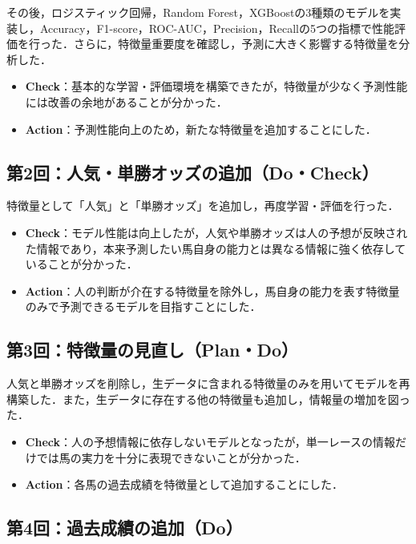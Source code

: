 \documentclass[dvipdfmx, a4paper, 11pt, titlepage]{jsarticle}
\begin{document}
その後，ロジスティック回帰，Random Forest，XGBoostの3種類のモデルを実装し，Accuracy，F1-score，ROC-AUC，Precision，Recallの5つの指標で性能評価を行った．さらに，特徴量重要度を確認し，予測に大きく影響する特徴量を分析した．

\begin{itemize}
    \item \textbf{Check}：基本的な学習・評価環境を構築できたが，特徴量が少なく予測性能には改善の余地があることが分かった．
    \item \textbf{Action}：予測性能向上のため，新たな特徴量を追加することにした．
\end{itemize}

\subsection{第2回：人気・単勝オッズの追加（Do・Check）}

特徴量として「人気」と「単勝オッズ」を追加し，再度学習・評価を行った．

\begin{itemize}
    \item \textbf{Check}：モデル性能は向上したが，人気や単勝オッズは人の予想が反映された情報であり，本来予測したい馬自身の能力とは異なる情報に強く依存していることが分かった．
    \item \textbf{Action}：人の判断が介在する特徴量を除外し，馬自身の能力を表す特徴量のみで予測できるモデルを目指すことにした．
\end{itemize}

\subsection{第3回：特徴量の見直し（Plan・Do）}

人気と単勝オッズを削除し，生データに含まれる特徴量のみを用いてモデルを再構築した．また，生データに存在する他の特徴量も追加し，情報量の増加を図った．

\begin{itemize}
    \item \textbf{Check}：人の予想情報に依存しないモデルとなったが，単一レースの情報だけでは馬の実力を十分に表現できないことが分かった．
    \item \textbf{Action}：各馬の過去成績を特徴量として追加することにした．
\end{itemize}

\subsection{第4回：過去成績の追加（Do）}
\end{document}
